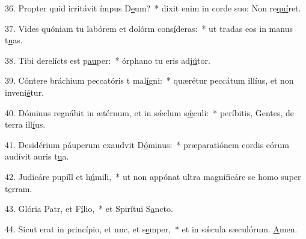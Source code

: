 36. Propter quid irritávit ímpus D\uline{e}um?~* dixit enim in corde suo: Non re\uline{quí}ret.\par 
37. Vides quóniam tu labórem et dolórm cons\uline{í}deras:~* ut tradas eos in manus t\uline{u}as.\par 
38. Tibi derelícts est p\uline{au}per:~* órphano tu eris adj\uline{ú}tor.\par 
39. Cóntere bráchium peccatóris t mal\uline{í}gni:~* quærétur peccátum illíus, et non inveni\uline{é}tur.\par 
40. Dóminus regnábit in ætérnum, et in sǽclum s\uline{ǽ}culi:~* períbitis, Gentes, de terra ill\uline{í}us.\par 
41. Desidérium páuperum exaudvit D\uline{ó}minus:~* præparatiónem cordis eórum audívit auris t\uline{u}a.\par 
42. Judicáre pupíll et h\uline{ú}mili,~* ut non appónat ultra magnificáre se homo super t\uline{e}rram.\par 
43. Glória Patr, et F\uline{í}lio,~* et Spirítui S\uline{a}ncto.\par 
44. Sicut erat in princípio, et nnc, et s\uline{e}mper,~* et in sǽcula sæculórum. \uline{A}men.\par 
